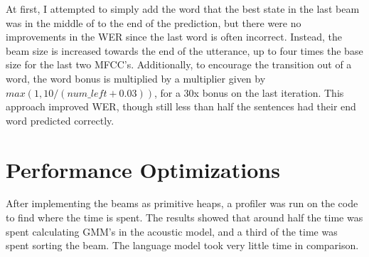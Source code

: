 \documentclass[11pt]{article}
\begin{document}
At first, I attempted to simply add the word that the best state in the last beam was in the middle of to the end of the prediction, but there were no improvements in the WER since the last word is often incorrect. Instead, the beam size is increased towards the end of the utterance, up to four times the base size for the last two MFCC's. Additionally, to encourage the transition out of a word, the word bonus is multiplied by a multiplier given by $max(1, 10/(num\_left + 0.03))$, for a 30x bonus on the last iteration. This approach improved WER, though still less than half the sentences had their end word predicted correctly. 

\section{Performance Optimizations}

After implementing the beams as primitive heaps, a profiler was run on the code to find where the time is spent. The results showed that around half the time was spent calculating GMM's in the acoustic model, and a third of the time was spent sorting the beam. The language model took very little time in comparison.
\end{document}
